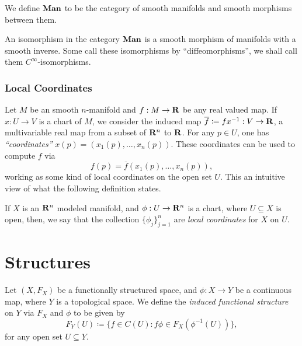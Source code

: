 \begin{definition}
\label{def:smooth-manifolds-category}
We define \({\textbf{Man}}\) to be the category of smooth manifolds and smooth morphisms
between them.
\end{definition}

\begin{corollary}
\label{cor:isomorphism-man}
An isomorphism in the category \({\textbf{Man}}\) is a smooth morphism of manifolds with a
smooth inverse. Some call these isomorphisms by ``diffeomorphisms'', we shall
call them \(C^{\infty}\)-isomorphisms.
\end{corollary}

\subsubsection{Local Coordinates}

Let \(M\) be an smooth \(n\)-manifold and \(f: M \to \mathbf{R}\) be any real valued
map. If \(x: U \to V\) is a chart of \(M\), we consider the induced map
\(\overline{f} \coloneq f x^{-1}: V \to \mathbf{R}\), a multivariable real map from a
subset of \(\mathbf{R}^n\) to \(\mathbf{R}\). For any \(p \in U\), one has
\emph{``coordinates''} \(x(p) = (x_1(p), \dots, x_n(p))\). These coordinates can
be used to compute \(f\) via
\[
f(p) = \overline{f}(x_1(p), \dots, x_n(p)),
\]
working as some kind of local coordinates on the open set \(U\). This an
intuitive view of what the following definition states.

\begin{definition}
\label{def:local-coordinates}
If \(X\) is an \(\mathbf{R}^n\) modeled manifold, and \(\phi: U \to \mathbf{R}^n\) is a chart,
where \(U \subseteq X\) is open, then, we say that the collection
\(\{\phi_j\}_{j=1}^n\) are \emph{local coordinates} for \(X\) on \(U\).
\end{definition}

\section{Structures}

\begin{definition}
\label{def:induced-functional-structure-space}
Let \((X, F_X)\) be a functionally structured space, and \(\phi: X \to Y\) be a
continuous map, where \(Y\) is a topological space. We define the \emph{induced
  functional structure} on \(Y\) via \(F_X\) and \(\phi\) to be given by
\[
F_Y(U) \coloneq \{f \in C(U) \colon f \phi \in F_X(\phi^{-1}(U))\},
\]
for any open set \(U \subseteq Y\).
\end{definition}

